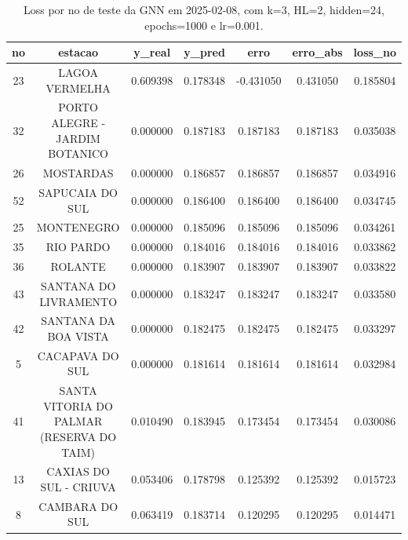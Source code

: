 \begin{table}[h]
\centering
\caption{Loss por no de teste da GNN em 2025-02-08, com k=3, HL=2, hidden=24, epochs=1000 e lr=0.001.}
\label{tab:gnn_loss_k3_hl2_h24_e1000_d20250208}
\begin{tabular}{ccccccc}
\toprule
no & estacao & y\_real & y\_pred & erro & erro\_abs & loss\_no \\
\midrule
23 & LAGOA VERMELHA & 0.609398 & 0.178348 & -0.431050 & 0.431050 & 0.185804 \\
32 & PORTO ALEGRE - JARDIM BOTANICO & 0.000000 & 0.187183 & 0.187183 & 0.187183 & 0.035038 \\
26 & MOSTARDAS & 0.000000 & 0.186857 & 0.186857 & 0.186857 & 0.034916 \\
52 & SAPUCAIA DO SUL & 0.000000 & 0.186400 & 0.186400 & 0.186400 & 0.034745 \\
25 & MONTENEGRO & 0.000000 & 0.185096 & 0.185096 & 0.185096 & 0.034261 \\
35 & RIO PARDO & 0.000000 & 0.184016 & 0.184016 & 0.184016 & 0.033862 \\
36 & ROLANTE & 0.000000 & 0.183907 & 0.183907 & 0.183907 & 0.033822 \\
43 & SANTANA DO LIVRAMENTO & 0.000000 & 0.183247 & 0.183247 & 0.183247 & 0.033580 \\
42 & SANTANA DA BOA VISTA & 0.000000 & 0.182475 & 0.182475 & 0.182475 & 0.033297 \\
5 & CACAPAVA DO SUL & 0.000000 & 0.181614 & 0.181614 & 0.181614 & 0.032984 \\
41 & SANTA VITORIA DO PALMAR (RESERVA DO TAIM) & 0.010490 & 0.183945 & 0.173454 & 0.173454 & 0.030086 \\
13 & CAXIAS DO SUL - CRIUVA & 0.053406 & 0.178798 & 0.125392 & 0.125392 & 0.015723 \\
8 & CAMBARA DO SUL & 0.063419 & 0.183714 & 0.120295 & 0.120295 & 0.014471 \\
\bottomrule
\end{tabular}
\end{table}
